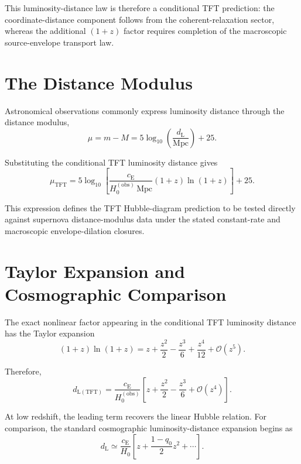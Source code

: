 This luminosity-distance law is therefore a conditional TFT prediction: the coordinate-distance component follows from the coherent-relaxation sector, whereas the additional $(1+z)$ factor requires completion of the macroscopic source-envelope transport law.

\section{The Distance Modulus}

Astronomical observations commonly express luminosity distance through the distance modulus,
\begin{equation}
    \mu = m-M
    =
    5\log_{10}
    \left(
        \frac{d_{\mathrm{L}}}{\mathrm{Mpc}}
    \right)
    +25.
\end{equation}

Substituting the conditional TFT luminosity distance gives
\begin{equation}
    \mu_{\mathrm{TFT}}
    =
    5\log_{10}
    \left[
        \frac{c_{\mathrm{E}}}
        {H_0^{(\mathrm{obs})}\,\mathrm{Mpc}}
        (1+z)\ln(1+z)
    \right]
    +25.
\end{equation}

This expression defines the TFT Hubble-diagram prediction to be tested directly against supernova distance-modulus data under the stated constant-rate and macroscopic envelope-dilation closures.

\section{Taylor Expansion and Cosmographic Comparison}

The exact nonlinear factor appearing in the conditional TFT luminosity distance has the Taylor expansion
\begin{equation}
    (1+z)\ln(1+z)
    =
    z
    +
    \frac{z^2}{2}
    -
    \frac{z^3}{6}
    +
    \frac{z^4}{12}
    +\mathcal{O}(z^5).
\end{equation}

Therefore,
\begin{equation}
    d_{\mathrm{L(TFT)}}
    =
    \frac{c_{\mathrm{E}}}{H_0^{(\mathrm{obs})}}
    \left[
        z
        +
        \frac{z^2}{2}
        -
        \frac{z^3}{6}
        +
        \mathcal{O}(z^4)
    \right].
\end{equation}

At low redshift, the leading term recovers the linear Hubble relation. For comparison, the standard cosmographic luminosity-distance expansion begins as
\begin{equation}
    d_{\mathrm{L}}
    \simeq
    \frac{c_{\mathrm{E}}}{H_0}
    \left[
        z
        +
        \frac{1-q_0}{2}z^2
        +\cdots
    \right].
\end{equation}

